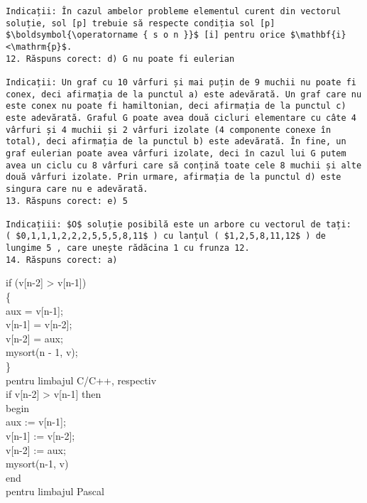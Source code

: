\begin{verbatim}
Indicații: În cazul ambelor probleme elementul curent din vectorul soluție, sol [p] trebuie să respecte condiția sol [p] $\boldsymbol{\operatorname { s o n }}$ [i] pentru orice $\mathbf{i}<\mathrm{p}$.
12. Răspuns corect: d) G nu poate fi eulerian

Indicații: Un graf cu 10 vârfuri și mai puțin de 9 muchii nu poate fi conex, deci afirmația de la punctul a) este adevărată. Un graf care nu este conex nu poate fi hamiltonian, deci afirmația de la punctul c) este adevărată. Graful G poate avea două cicluri elementare cu câte 4 vârfuri și 4 muchii și 2 vârfuri izolate (4 componente conexe în total), deci afirmația de la punctul b) este adevărată. În fine, un graf eulerian poate avea vârfuri izolate, deci în cazul lui G putem avea un ciclu cu 8 vârfuri care să conțină toate cele 8 muchii și alte două vârfuri izolate. Prin urmare, afirmația de la punctul d) este singura care nu e adevărată.
13. Răspuns corect: e) 5

Indicațiii: $O$ soluție posibilă este un arbore cu vectorul de tați:
( $0,1,1,1,2,2,2,5,5,5,8,11$ ) cu lanțul ( $1,2,5,8,11,12$ ) de lungime 5 , care unește rădăcina 1 cu frunza 12.
14. Răspuns corect: a)
\end{verbatim}

if (v[n-2] > v[n-1])\\
\{\\[0pt]
aux = v[n-1];\\[0pt]
v[n-1] = v[n-2];\\[0pt]
v[n-2] = aux;\\
mysort(n - 1, v);\\
\}\\
pentru limbajul C/C++, respectiv\\[0pt]
if v[n-2] > v[n-1] then\\
begin\\[0pt]
aux := v[n-1];\\[0pt]
v[n-1] := v[n-2];\\[0pt]
v[n-2] := aux;\\
mysort(n-1, v)\\
end\\
pentru limbajul Pascal


